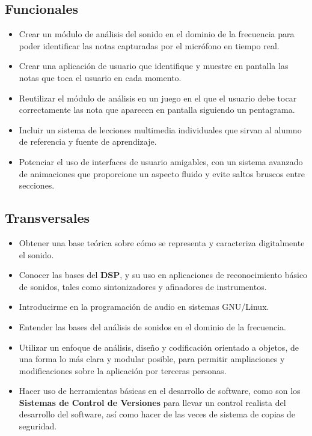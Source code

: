 \documentclass[a4paper, 12pt, halfparskip]{scrbook}
\begin{document}
\subsection{Funcionales}
\begin{itemize}
\item Crear un módulo de análisis del sonido en el dominio de la
  frecuencia para poder identificar las notas capturadas por el
  micrófono en tiempo real.
\item Crear una aplicación de usuario que identifique y muestre en
  pantalla las notas que toca el usuario en cada momento.
\item Reutilizar el módulo de análisis en un juego en el que el
  usuario debe tocar correctamente las nota que aparecen en pantalla
  siguiendo un pentagrama.
\item Incluir un sistema de lecciones multimedia individuales que
  sirvan al alumno de referencia y fuente de aprendizaje.
\item Potenciar el uso de interfaces de usuario amigables, con un
  sistema avanzado de animaciones que proporcione un aspecto fluido y
  evite saltos bruscos entre secciones.
\end{itemize}

\subsection{Transversales}
\begin{itemize}
\item Obtener una base teórica sobre cómo se representa y caracteriza
  digitalmente el sonido.
\item Conocer las bases del \textbf{DSP}, y su uso en aplicaciones de
  reconocimiento básico de sonidos, tales como sintonizadores y
  afinadores de instrumentos.
\item Introducirme en la programación de audio en sistemas GNU/Linux.
\item Entender las bases del análisis de sonidos en el dominio de la
  frecuencia. 
\item Utilizar un enfoque de análisis, diseño y codificación orientado
  a objetos, de una forma lo más clara y modular posible, para
  permitir ampliaciones y modificaciones sobre la aplicación por
  terceras personas.
\item Hacer uso de herramientas básicas en el desarrollo de software,
  como son los \textbf{Sistemas de Control de Versiones} para llevar
  un control realista del desarrollo del software, así como hacer de
  las veces de sistema de copias de seguridad.
\end{itemize}
\end{document}
